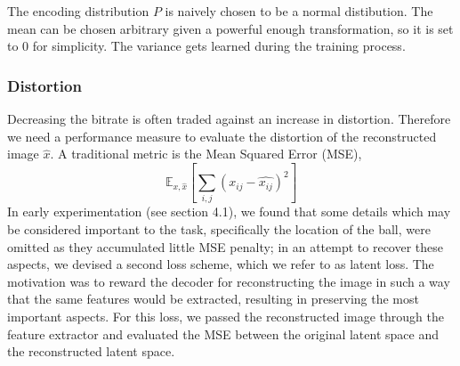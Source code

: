 


        The encoding distribution $P$ is naively chosen to be a normal distibution. The
        mean can be chosen arbitrary given a powerful enough transformation, so it is
        set to 0 for simplicity. The variance gets learned during the training process.

    \subsubsection{Distortion}\label{sub:Distortion}
        Decreasing the bitrate is often traded against an increase in distortion.
        Therefore we need a performance measure to evaluate the distortion of the
        reconstructed image $\hat{x}$. A traditional metric is the Mean Squared Error (MSE),
        \begin{equation}\label{equ:L2}
            \mathbb{E}_{x, \hat{x}}[\sum_{i,j} (x_{ij} - \hat{x_{ij}})^2]
        \end{equation}
        In early experimentation (see section 4.1), we found that some details which
        may be considered important to the task, specifically the location of the
        ball, were omitted as they accumulated little MSE penalty; in an attempt to
        recover these aspects, we devised a second loss scheme, which we refer to as
        latent loss. The motivation was to reward the decoder for reconstructing the
        image in such a way that the same features would be extracted, resulting in
        preserving the most important aspects. For this loss, we passed the
        reconstructed image through the feature extractor and evaluated the MSE
        between the original latent space and the reconstructed latent space.


        
